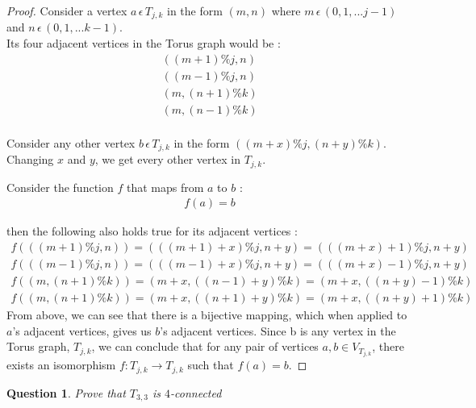 \documentclass{article}
\newtheorem{question}{Question}
\begin{document}
\begin{proof}
    Consider a vertex $a \hspace{2pt} \epsilon \hspace{2pt} T_{j,k}$ in the form
    $(m,n)$ where $m \hspace{2pt} \epsilon \hspace{2pt} (0, 1, ... j-1)$ and $n \hspace{2pt} \epsilon \hspace{2pt} (0, 1, ... k-1)$. \\

    Its four adjacent vertices in the Torus graph would be :
    \begin{align*}
        ((m+1)\%j, n) \\
        ((m-1)\%j, n) \\
        (m, (n+1)\%k) \\
        (m, (n-1)\%k) \\
    \end{align*}

    Consider any other vertex $b \hspace{2pt} \epsilon \hspace{2pt} T_{j,k}$ in the form $((m+x) \% j,(n+y) \% k)$. Changing $x$ and $y$, we get every other vertex in $T_{j,k}$.

    Consider the function $f$ that maps from $a$ to $b$ :
    \begin{align*}
     f(a) = b
    \end{align*}

    then the following also holds true for its adjacent vertices :
    \begin{align*}
        f(((m+1)\%j, n)) = (((m+1)+x)\%j, n+y) = (((m+x)+1)\%j, n+y) \\
        f(((m-1)\%j, n)) = (((m-1)+x)\%j, n+y) = (((m+x)-1)\%j, n+y) \\
        f((m, (n+1)\%k)) = (m+x, ((n-1)+y)\%k) = (m+x, ((n+y)-1)\%k) \\
        f((m, (n+1)\%k)) = (m+x, ((n+1)+y)\%k) = (m+x, ((n+y)+1)\%k)
    \end{align*}
    From above, we can see that there is a bijective mapping, which when applied to $a$'s adjacent vertices, gives us $b$'s adjacent vertices. Since b is any vertex in the Torus graph, $T_{j,k}$, we can conclude that for any pair of vertices $a,b \in V_{T_{j,k}}$, there exists an isomorphism $f:T_{j,k} \to T_{j,k}$ such that $f(a) = b$.
\end{proof}
\pagebreak
\begin{question}
    Prove that $T_{3,3}$ is $4$-connected
    \end{question}
\end{document}

